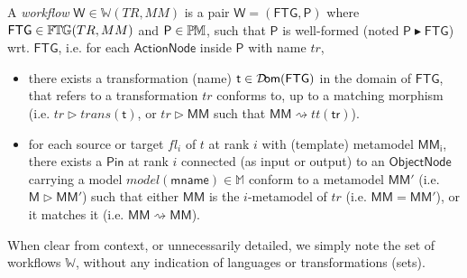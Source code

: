 \begin{Definition}
   A \emph{workflow} $\mathsf{W}\in\mathbb{W}(TR, MM)$ is a pair $\mathsf{W} = 
(\mathsf{FTG}, \mathsf{P})$ where $\mathsf{FTG}\in\mathbb{F}\mskip-1mu\mathbb{T}\mskip-1mu\mathbb{G}(TR, MM)$ and 
$\mathsf{P}\in\mathbb{P}\mskip-1mu\mathbb{M}$, such that $\mathsf{P}$ is well-formed (noted 
$\mathsf{P} \blacktriangleright \mathsf{FTG}$) wrt. $\mathsf{FTG}$, i.e. for 
each $\mathsf{ActionNode}$ inside $\mathsf{P}$ with name 
$tr$,
\begin{itemize}
   \item there exists a transformation (name) $\mathsf{t}\in 
\mathsf{\mathcal{D}\!om}(\mathsf{FTG})$ in the domain of $\mathsf{FTG}$, that refers to a 
transformation $tr$ conforms to, up to a matching morphism (i.e. 
$tr \rhd trans(\mathsf{t})$, or $tr \rhd \mathsf{MM}$ such that $\mathsf{MM} 
\rightsquigarrow tt(\mathsf{tr})$).
  
   \item for each source or target $fl_i$ of $t$ at rank $i$ with (template) 
metamodel $\mathsf{MM_i}$, there exists a $\mathsf{Pin}$ at rank $i$ connected 
(as input or output) to an $\mathsf{ObjectNode}$ carrying a model 
$model(\mathsf{mname}) \in \mathbb{M}$ conform to a metamodel $\mathsf{MM'}$ 
(i.e. $\mathsf{M} \rhd \mathsf{MM'}$) such that either $\mathsf{MM}$ is the 
$i$-metamodel of $tr$ (i.e. $\mathsf{MM} = \mathsf{MM'}$), or it matches it 
(i.e. $\mathsf{MM} \rightsquigarrow \mathsf{MM}$).

%       
\end{itemize}
\end{Definition}
\noindent
When clear from context, or unnecessarily detailed, we simply note the set of 
workflows $\mathbb{W}$, without any indication of languages or 
transformations (sets).

